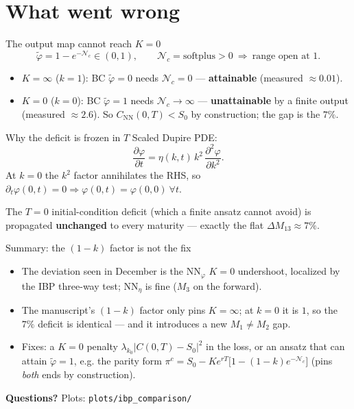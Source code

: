\documentclass[aspectratio=169,11pt]{beamer}
\begin{document}
\section{What went wrong}

\begin{frame}{The output map cannot reach $K\!=\!0$}
  \[
    \tilde\varphi = 1 - e^{-\mathcal{N}_c}\in(0,1),\qquad
    \mathcal{N}_c = \text{softplus}>0\ \Rightarrow\ \text{range open at }1.
  \]
  \begin{itemize}
    \item $K=\infty$ ($k=1$): BC $\tilde\varphi=0$ needs $\mathcal{N}_c=0$ ---
          \textbf{attainable} (measured $\approx0.01$).
    \item $K=0$ ($k=0$): BC $\tilde\varphi=1$ needs $\mathcal{N}_c\to\infty$ ---
          \textbf{unattainable} by a finite output (measured $\approx2.6$).
          So $C_{\mathrm{NN}}(0,T)<S_0$ by construction; the gap is the $7\%$.
  \end{itemize}
\end{frame}

\begin{frame}{Why the deficit is frozen in $T$}
  Scaled Dupire PDE:
  \[
    \frac{\partial\varphi}{\partial t} = \eta(k,t)\,k^2\,\frac{\partial^2\varphi}{\partial k^2}.
  \]
  At $k=0$ the $k^2$ factor annihilates the RHS, so
  $\partial_t\varphi(0,t)=0 \Rightarrow \varphi(0,t)=\varphi(0,0)\ \forall t$.

  \vspace{0.5em}
  The $T=0$ initial-condition deficit (which a finite ansatz cannot avoid) is
  propagated \textbf{unchanged} to every maturity --- exactly the flat
  $\Delta M_{13}\approx7\%$.
\end{frame}

\begin{frame}{Summary: the $(1-k)$ factor is not the fix}
  \begin{itemize}
    \item The deviation seen in December is the $\mathrm{NN}_\varphi$ $K{=}0$
          undershoot, localized by the IBP three-way test;
          $\mathrm{NN}_\eta$ is fine ($M_3$ on the forward).
    \item The manuscript's $(1-k)$ factor only pins $K=\infty$; at $k=0$ it is
          $1$, so the $7\%$ deficit is identical --- and it introduces a new
          $M_1\neq M_2$ gap.
    \item Fixes: a $K{=}0$ penalty
          $\lambda_{k_0}|C(0,T)-S_0|^2$ in the loss, or an ansatz that can
          attain $\tilde\varphi=1$, e.g. the parity form
          $\pi^c = S_0 - Ke^{rT}\bigl[1-(1-k)e^{-\mathcal{N}_c}\bigr]$
          (pins \emph{both} ends by construction).
  \end{itemize}
\end{frame}

\begin{frame}{}
  \begin{center}
    \vspace{2cm}
    {\Huge\bfseries\color{white} Questions?}
    \vspace{0.5cm}
    {\large\color{ntugold}Plots: \texttt{plots/ibp\_comparison/}}
  \end{center}
\end{frame}
\end{document}
